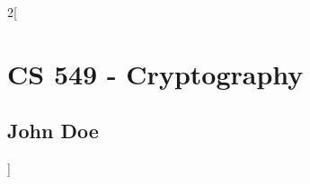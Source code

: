 \documentclass[8pt]{extarticle}
\begin{document}
\setlength{\abovedisplayskip}{0pt}
\setlength{\belowdisplayskip}{0pt}
\setlength\itemsep{0em}

\begin{multicols*}{2}[
\section*{CS 549 - Cryptography}
\subsection*{John Doe}]

%

\end{multicols*}
\end{document}
